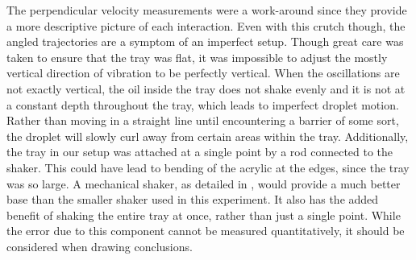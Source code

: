 The perpendicular velocity measurements were a work-around since they provide a more descriptive picture of each interaction. Even with this crutch though, the angled trajectories are a symptom of an imperfect setup. Though great care was taken to ensure that the tray was flat, it was impossible to adjust the mostly vertical direction of vibration to be perfectly vertical. When the oscillations are not exactly vertical, the oil inside the tray does not shake evenly and it is not at a constant depth throughout the tray, which leads to imperfect droplet motion. Rather than moving in a straight line until encountering a barrier of some sort, the droplet will slowly curl away from certain areas within the tray. Additionally, the tray in our setup was attached at a single point by a rod connected to the shaker. This could have lead to bending of the acrylic at the edges, since the tray was so large. A mechanical shaker, as detailed in , would provide a much better base than the smaller shaker used in this experiment. It also has the added benefit of shaking the entire tray at once, rather than just a single point. While the error due to this component cannot be measured quantitatively, it should be considered when drawing conclusions.




